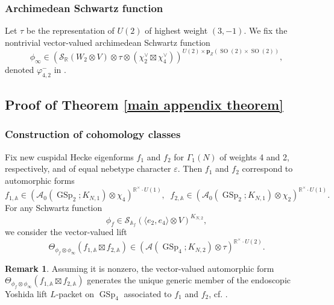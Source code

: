 \documentclass[12pt]{amsart}
\def\bA{\mathbb{A}}
\theoremstyle{definition}
\newtheorem{rem}[thm]{Remark}
\newcommand{\R}{\mathbb{R}}
\DeclareMathOperator{\SO}{SO}
\DeclareMathOperator{\GSp}{GSp}
\begin{document}
\subsubsection{Archimedean Schwartz function}
Let $\tau$ be the representation of $U(2)$ of highest weight $(3, -1)$.
We fix the nontrivial vector-valued archimedean Schwartz function
$$\phi_\infty \in \left( \mathcal S_{\R}(W_2\otimes V)\otimes \tau \otimes(\chi_2^\vee\boxtimes \chi_4^\vee)\right)^{U(2) \times \boldsymbol{p}_Z(\SO(2)\times \SO(2))},$$ denoted $\varphi^-_{4,2}$ in \cite[\S7.1.6]{sweeting2022tateclassesendoscopyoperatornamegsp4}. 

\subsection{Proof of Theorem \ref{main appendix theorem}}\label{appendix subsection proof}
\subsubsection{Construction of cohomology classes}
Fix new cuspidal Hecke eigenforms $f_1$ and $f_2$ for $\Gamma_1(N)$ of weights 4 and 2, respectively, and of equal nebetype character $\varepsilon$. Then  $f_1$ and $f_2$ correspond to automorphic forms
$$f_{1, \bA} \in \left(\mathcal A_0(\GSp_2; K_{N,1}) \otimes \chi_4\right)^{\R^\times \cdot U(1)},\;\; f_{2,\bA} \in \left(\mathcal A_0(\GSp_2; K_{N,1})\otimes \chi_2\right)^{\R^\times\cdot U(1)}.$$ 
For any Schwartz function $$\phi_f\in \mathcal S_{\bA_f}( \langle e_2, e_4 \rangle \otimes V)^{K_{N,2}},$$
we consider the vector-valued lift $$\Theta_{\phi_f\otimes \phi_\infty} (f_{1,\bA}\boxtimes f_{2,\bA}) \in \left(\mathcal A(\GSp_4; K_{N,2})\otimes \tau\right)^{\R^\times \cdot U(2)}.$$
\begin{rem}
    Assuming it is nonzero, the vector-valued automorphic form $\Theta_{\phi_f\otimes \phi_\infty} (f_{1,\bA}\boxtimes f_{2,\bA})$ generates the unique generic member of the endoscopic Yoshida lift $L$-packet on $\GSp_4$ associated to $f_1$ and $f_2$, cf. \cite{roberts2001global}. 
\end{rem}
\end{document}
